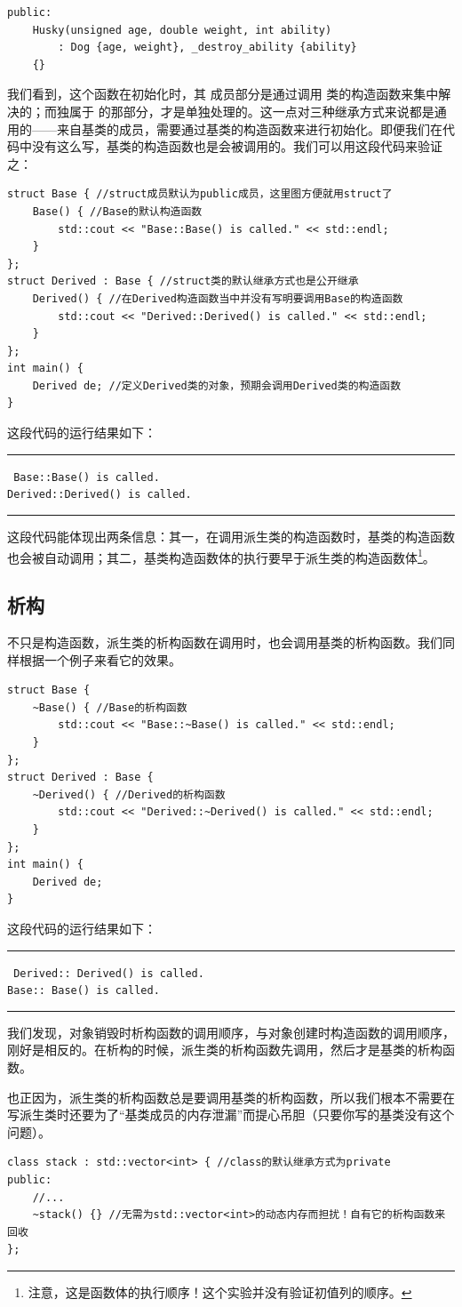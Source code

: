 \begin{lstlisting}
public:
    Husky(unsigned age, double weight, int ability)
        : Dog {age, weight}, _destroy_ability {ability}
    {}
\end{lstlisting}\par
我们看到，这个函数在初始化时，其 \lstinline@Dog@ 成员部分是通过调用 \lstinline@Dog@ 类的构造函数来集中解决的；而独属于 \lstinline@Husky@ 的那部分，才是单独处理的。这一点对三种继承方式来说都是通用的——来自基类的成员，需要通过基类的构造函数来进行初始化。即便我们在代码中没有这么写，基类的构造函数也是会被调用的。我们可以用这段代码来验证之：
\begin{lstlisting}
struct Base { //struct成员默认为public成员，这里图方便就用struct了
    Base() { //Base的默认构造函数
        std::cout << "Base::Base() is called." << std::endl;
    }
};
struct Derived : Base { //struct类的默认继承方式也是公开继承
    Derived() { //在Derived构造函数当中并没有写明要调用Base的构造函数
        std::cout << "Derived::Derived() is called." << std::endl;
    }
};
int main() {
    Derived de; //定义Derived类的对象，预期会调用Derived类的构造函数
}
\end{lstlisting}
这段代码的运行结果如下：\\\noindent\rule{\linewidth}{.2pt}\texttt{
Base::Base() is called.\\
Derived::Derived() is called.
}\\\noindent\rule{\linewidth}{.2pt}
这段代码能体现出两条信息：其一，在调用派生类的构造函数时，基类的构造函数也会被自动调用；其二，基类构造函数体的执行要早于派生类的构造函数体\footnote{注意，这是函数体的执行顺序！这个实验并没有验证初值列的顺序。}。\par
\subsection*{析构}
不只是构造函数，派生类的析构函数在调用时，也会调用基类的析构函数。我们同样根据一个例子来看它的效果。
\begin{lstlisting}
struct Base {
    ~Base() { //Base的析构函数
        std::cout << "Base::~Base() is called." << std::endl;
    }
};
struct Derived : Base {
    ~Derived() { //Derived的析构函数
        std::cout << "Derived::~Derived() is called." << std::endl;
    }
};
int main() {
    Derived de;
}
\end{lstlisting}
这段代码的运行结果如下：\\\noindent\rule{\linewidth}{.2pt}\texttt{
Derived::~Derived() is called.\\
Base::~Base() is called.
}\\\noindent\rule{\linewidth}{.2pt}
我们发现，对象销毁时析构函数的调用顺序，与对象创建时构造函数的调用顺序，刚好是相反的。在析构的时候，派生类的析构函数先调用，然后才是基类的析构函数。\par
也正因为，派生类的析构函数总是要调用基类的析构函数，所以我们根本不需要在写派生类时还要为了``基类成员的内存泄漏''而提心吊胆（只要你写的基类没有这个问题）。
\begin{lstlisting}
class stack : std::vector<int> { //class的默认继承方式为private
public:
    //...
    ~stack() {} //无需为std::vector<int>的动态内存而担扰！自有它的析构函数来回收
};
\end{lstlisting}\par
